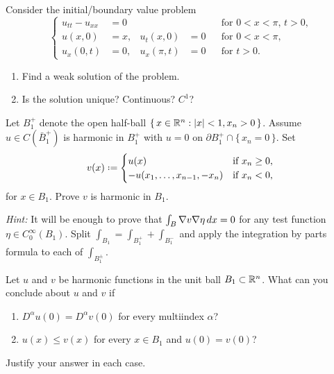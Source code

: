 \begin{problem}
  Consider the initial/boundary value problem
    \[
     \left\{
       \begin{aligned}
         u_{tt}-u_{xx}&=0&&&&\text{for \(0<x<\pi\), \(t>0\),}\\
         u(x,0)&=x,&u_t(x,0)&=0&&\text{for \(0<x<\pi\),}\\
         u_x(0,t)&=0,&u_x(\pi,t)&=0&&\text{for \(t>0\).}
      \end{aligned}
    \right.
  \]
  \begin{enumerate}[label=(\alph*),noitemsep]
  \item Find a weak solution of the problem.
  \item Is the solution unique? Continuous? \(C^1\)?
  \end{enumerate}
\end{problem}
\begin{solution*}
\end{solution*}

\begin{problem}
  Let \(B_1^+\) denote the open half-ball
  \(\{\,x\in\mathbb{R}^n:|x|<1,x_n>0\,\}\). Assume \(u\in C(\bar B_1^+)\) is
  harmonic in \(B_1^+\) with \(u=0\) on \(\partial
  B_1^+\cap\{\,x_n=0\,\}\). Set
  \[
    v(x)\defeq
    \begin{cases}
      u(x)&\text{if \(x_n\geq 0\),}\\
      -u(x_1,\dotsc,x_{n-1},-x_n)&\text{if \(x_n<0\),}
    \end{cases}
  \]
  for \(x\in B_1\). Prove \(v\) is harmonic in \(B_1\).

  \noindent\emph{Hint:} It will be enough to prove that
  \(\int_B\nabla v\nabla\eta\mathop{}\!d x=0\) for any test function
  \(\eta\in C^\infty_0(B_1)\). Split
  \(\int_{B_1}=\int_{B_1^+}+\int_{B_1^-}\) and apply the integration by
  parts formula to each of \(\int_{B_1^\pm}\).
\end{problem}
\begin{solution*}
\end{solution*}

\begin{problem}
  Let \(u\) and \(v\) be harmonic functions in the unit ball
  \(B_1\subset\R^n\). What can you conclude about \(u\) and \(v\) if
  \begin{enumerate}[label=(\alph*),noitemsep]
  \item \(D^\alpha u(0)=D^\alpha v(0)\) for every multiindex \(\alpha\)?
  \item \(u(x)\leq v(x)\) for every \(x\in B_1\) and \(u(0)=v(0)\)?
  \end{enumerate}
  Justify your answer in each case.
\end{problem}
\begin{solution*}
\end{solution*}

